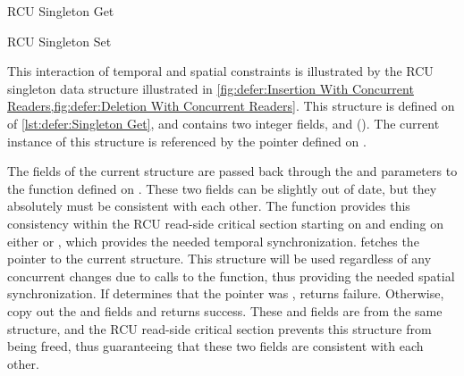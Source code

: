 \begin{listing}

\caption{RCU Singleton Get}
\label{lst:defer:Singleton Get}
\end{listing}

\begin{listing}

\caption{RCU Singleton Set}
\label{lst:defer:Singleton Set}
\end{listing}

\begin{fcvref}
This interaction of temporal and spatial constraints is illustrated
by the RCU singleton data structure illustrated in
\cref{fig:defer:Insertion With Concurrent Readers,fig:defer:Deletion With Concurrent Readers}.
This structure is defined on  of
\cref{lst:defer:Singleton Get}, and contains two integer fields,
 and  ().
The current instance of this structure is referenced by the 
pointer defined on .
\end{fcvref}

\begin{fcvref}
The fields of the current structure are passed back through the
 and  parameters to the  function
defined on .
These two fields can be slightly out of date, but they absolutely must
be consistent with each other.
The  function provides this consistency
within the RCU read-side critical section starting on
 and ending on either  or ,
which provides the needed temporal synchronization.
 fetches the pointer to the current  structure.
This structure will be used regardless of any concurrent changes due
to calls to the  function, thus providing the needed
spatial synchronization.
If  determines that the  pointer was
,  returns failure.
Otherwise,  copy out the  and  fields
and  returns success.
These  and  fields are from the same 
structure, and the RCU read-side critical section prevents this structure
from being freed, thus guaranteeing that these two fields are consistent
with each other.
\end{fcvref}

